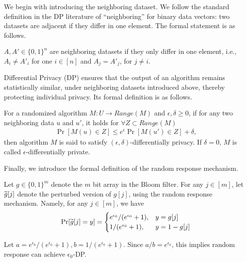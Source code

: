 We begin with introducing the neighboring dataset. We follow the standard definition in the DP literature of ``neighboring'' for binary data vectors: two datasets are adjacent if they differ in one element. The formal statement is as follows.

\begin{definition}\label{def:pre_neighbor_dataset}
$A, A' \in \{0,1\}^n$ are neighboring datasets if they only differ in one element, i.e., $A_i \neq A'_i$ for one $i \in [n]$ and $A_j = A'_j$, for $j \neq i$.
\end{definition}

Differential Privacy (DP) ensures that the output of an algorithm remains statistically similar, under neighboring datasets introduced above,
thereby protecting individual privacy. 
Its formal definition is as follows.

\begin{definition}\label{def:dp}
    For a randomized algorithm $M:U \rightarrow Range(M)$ and $\epsilon,\delta\geq 0$, if for any two neighboring data $u$ and $u'$, it holds for $\forall Z \subset Range(M)$
    \begin{align*}
        \Pr[M(u)\in Z] \leq e^{\epsilon} \Pr[M(u')\in Z]+\delta,
    \end{align*}
    then algorithm $M$ is said to satisfy $(\epsilon,\delta)$-differentially privacy. If $\delta = 0$, $M$ is called $\epsilon$-differentially private.
\end{definition}

Finally, we introduce the formal definition of the random response mechanism.

\begin{definition}  \label{def:random_response}
Let $g \in \{0, 1\}^m$ denote the $m$ bit array in the Bloom filter. For any $j \in [m]$, let $\widetilde{g}[j]$ denote the perturbed version of $g[j]$, using the random response mechanism. Namely, for any $j \in [m]$, we have
\begin{align*}
    \Pr [\widetilde{g}[j] = y] = 
    \begin{cases}
        e^{\epsilon_0} / (e^{\epsilon_0} + 1),  & y = g[j] \\
        1 / (e^{\epsilon_0} + 1), & y = 1 - g[j]
    \end{cases}
\end{align*}
\end{definition}

Let $a = e^{\epsilon_0} / (e^{\epsilon_0} + 1), b = 1 / (e^{\epsilon_0} + 1)$. Since $a / b = e^{\epsilon_0}$, this implies random response can achieve $\epsilon_0$-DP. 

